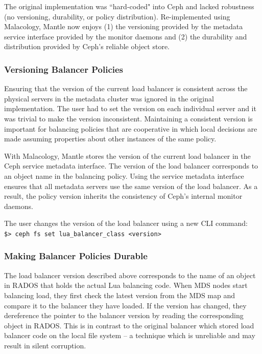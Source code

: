 \documentclass[preprint]{sigplanconf-eurosys}
\begin{document}
The original implementation was ``hard-coded" into Ceph and lacked robustness
(no versioning, durability, or policy distribution).  Re-implemented using
Malacology, Mantle now enjoys (1) the versioning provided by the metadata
service interface provided by the monitor daemons and (2) the durability and
distribution provided by Ceph's reliable object store.  

\subsubsection{Versioning Balancer Policies}

Ensuring that the version of the current load balancer is consistent across the
physical servers in the metadata cluster was ignored in the original
implementation. The user had to set the version on each individual server and
it was trivial to make the version inconsistent. Maintaining a consistent
version is important for balancing policies that are cooperative in which local
decisions are made assuming properties about other instances of the same
policy.

With Malacology, Mantle stores the version of the current load balancer in the
Ceph service metadata interface. The version of the load balancer corresponds
to an object name in the balancing policy. Using the service metadata interface
ensures that all metadata servers use the same version of the load balancer. As
a result, the policy version inherits the consistency of Ceph's internal
monitor daemons.

The user changes the version of the load balancer using a new CLI command: \\

\noindent \texttt{\$> ceph fs\ set\ lua\_balancer\_class\ \textless{}version\textgreater{}}

\subsubsection{Making Balancer Policies Durable}

The load balancer version described above corresponds to the name of an object
in RADOS that holds the actual Lua balancing code.  When MDS nodes start
balancing load, they first check the latest version from the MDS map and
compare it to the balancer they have loaded. If the version has changed, they
dereference the pointer to the balancer version by reading the corresponding
object in RADOS. This is in contrast to the original balancer which stored load
balancer code on the local file system -- a technique which is unreliable and
may result in silent corruption.
\end{document}
